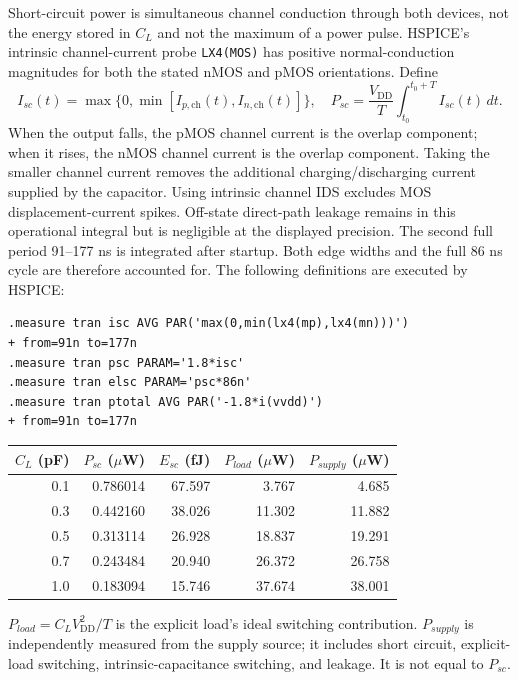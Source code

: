 \documentclass[11pt,a4paper]{article}
\newcommand{\VDD}{V_{\mathrm{DD}}}
\begin{document}
Short-circuit power is simultaneous channel conduction through both devices, not the energy stored in $C_L$ and not the maximum of a power pulse. HSPICE's intrinsic channel-current probe \texttt{LX4(MOS)} has positive normal-conduction magnitudes for both the stated nMOS and pMOS orientations. Define
\[
 I_{sc}(t)=\max\{0,\min[I_{p,\mathrm{ch}}(t),I_{n,\mathrm{ch}}(t)]\},
 \quad P_{sc}=\frac{\VDD}{T}\int_{t_0}^{t_0+T}I_{sc}(t)\,dt.
\]
When the output falls, the pMOS channel current is the overlap component; when it rises, the nMOS channel current is the overlap component. Taking the smaller channel current removes the additional charging/discharging current supplied by the capacitor. Using intrinsic channel IDS excludes MOS displacement-current spikes. Off-state direct-path leakage remains in this operational integral but is negligible at the displayed precision.
The second full period 91--177 ns is integrated after startup. Both edge widths and the full 86 ns cycle are therefore accounted for. The following definitions are executed by HSPICE:
\begin{lstlisting}
.measure tran isc AVG PAR('max(0,min(lx4(mp),lx4(mn)))')
+ from=91n to=177n
.measure tran psc PARAM='1.8*isc'
.measure tran elsc PARAM='psc*86n'
.measure tran ptotal AVG PAR('-1.8*i(vvdd)')
+ from=91n to=177n
\end{lstlisting}
\newpage
\begin{center}\begin{tabular}{rrrrr}\toprule
$C_L$ (pF)&$P_{sc}$ ($\mu$W)&$E_{sc}$ (fJ)&$P_{load}$ ($\mu$W)&$P_{supply}$ ($\mu$W)\\\midrule
0.1&0.786014&67.597&3.767&4.685\\
0.3&0.442160&38.026&11.302&11.882\\
0.5&0.313114&26.928&18.837&19.291\\
0.7&0.243484&20.940&26.372&26.758\\
1.0&0.183094&15.746&37.674&38.001\\
\bottomrule\end{tabular}\end{center}
$P_{load}=C_L\VDD^2/T$ is the explicit load's ideal switching contribution. $P_{supply}$ is independently measured from the supply source; it includes short circuit, explicit-load switching, intrinsic-capacitance switching, and leakage. It is not equal to $P_{sc}$.
\begin{center}\end{center}
\end{document}
